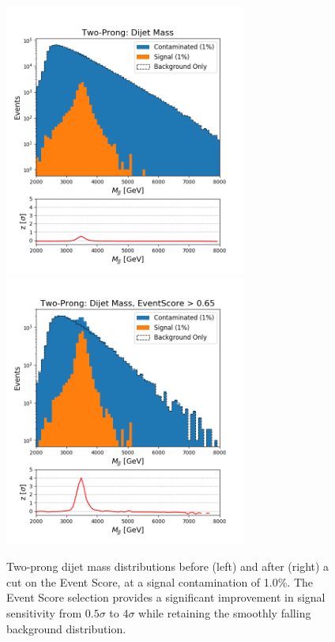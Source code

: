 \documentclass[12pt, a4paper]{article}
\begin{document}
\begin{figure}[H]
	\begin{center}
		\includegraphics[width=225pt]{imgs/2Prong_Contaminated_1p0_JJ_Mass_Multi_SaveForPaper.png}
		\includegraphics[width=225pt]{imgs/2Prong_Contaminated_1p0_JJ_Mass_EventScore0p65_Multi_SaveForPaper.png}
	\end{center}
	\caption{Two-prong dijet mass distributions before (left) and after (right) a cut on the Event Score, at a signal contamination of 1.0\%. The Event Score selection provides a significant improvement in signal sensitivity from $0.5\sigma$ to $4\sigma$ while retaining the smoothly falling background distribution.}
	\label{fig:2p_dijet}
\end{figure}
\end{document}
